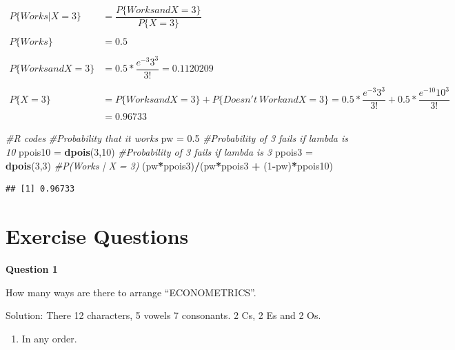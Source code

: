 \documentclass[]{book}
\newenvironment{Shaded}{\begin{snugshade}}{\end{snugshade}}
\newcommand{\CommentTok}[1]{\textcolor[rgb]{0.56,0.35,0.01}{\textit{#1}}}
\newcommand{\DecValTok}[1]{\textcolor[rgb]{0.00,0.00,0.81}{#1}}
\newcommand{\FloatTok}[1]{\textcolor[rgb]{0.00,0.00,0.81}{#1}}
\newcommand{\KeywordTok}[1]{\textcolor[rgb]{0.13,0.29,0.53}{\textbf{#1}}}
\newcommand{\NormalTok}[1]{#1}
\newcommand{\OperatorTok}[1]{\textcolor[rgb]{0.81,0.36,0.00}{\textbf{#1}}}
\newcommand{\StringTok}[1]{\textcolor[rgb]{0.31,0.60,0.02}{#1}}
\providecommand{\tightlist}{%
  \setlength{\itemsep}{0pt}\setlength{\parskip}{0pt}}
\theoremstyle{definition}
\theoremstyle{definition}
\theoremstyle{definition}
\theoremstyle{remark}
\begin{document}
\begin{enumerate}
  \begin{align*}
   P\{Works | X = 3\}  &= \dfrac{P\{Works and X = 3\}}{P\{X = 3\}} \\~\\
   P\{Works\} &= 0.5\\~\\
   P\{Works and X = 3\} &= 0.5 * \dfrac{e^{-3}3^3}{3!} = 0.1120209\\~\\
   P\{X = 3\} &= P\{Works and X = 3\} + P\{Doesn't\ Work and X = 3\} = 0.5 * \dfrac{e^{-3}3^3}{3!} + 0.5 * \dfrac{e^{-10}10^3}{3!} \\
   &= 0.96733
   \end{align*}

\begin{Shaded}
\begin{Highlighting}[]
\CommentTok{#R codes}
\CommentTok{#Probability that it works}
\NormalTok{pw =}\StringTok{ }\FloatTok{0.5}
\CommentTok{#Probability of 3 fails if lambda is 10}
\NormalTok{ppois10 =}\StringTok{ }\KeywordTok{dpois}\NormalTok{(}\DecValTok{3}\NormalTok{,}\DecValTok{10}\NormalTok{)}
\CommentTok{#Probability of 3 fails if lambda is 3}
\NormalTok{ppois3 =}\StringTok{ }\KeywordTok{dpois}\NormalTok{(}\DecValTok{3}\NormalTok{,}\DecValTok{3}\NormalTok{)}
\CommentTok{#P(Works | X = 3)}
\NormalTok{(pw}\OperatorTok{*}\NormalTok{ppois3)}\OperatorTok{/}\NormalTok{(pw}\OperatorTok{*}\NormalTok{ppois3 }\OperatorTok{+}\StringTok{ }\NormalTok{(}\DecValTok{1}\OperatorTok{-}\NormalTok{pw)}\OperatorTok{*}\NormalTok{ppois10)}
\end{Highlighting}
\end{Shaded}

\begin{verbatim}
## [1] 0.96733
\end{verbatim}
\end{enumerate}

\hypertarget{exercise-questions}{%
\chapter{Exercise Questions}\label{exercise-questions}}

\textbf{Question 1}

How many ways are there to arrange ``ECONOMETRICS''.

Solution: There 12 characters, 5 vowels 7 consonants. 2 Cs, 2 Es and 2
Os.

\begin{enumerate}
\def\labelenumi{\alph{enumi})}
\tightlist
\item
  In any order.
\end{enumerate}
\end{document}
